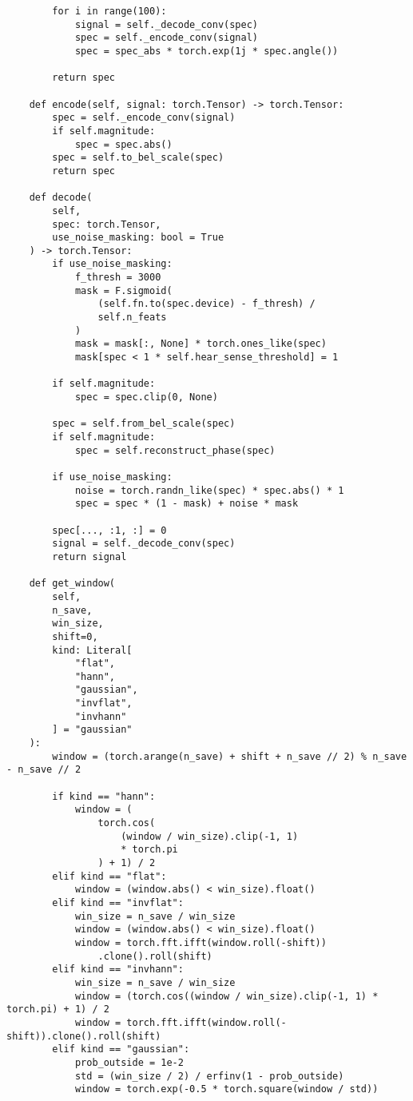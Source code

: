 \begin{verbatim}
        for i in range(100):
            signal = self._decode_conv(spec)
            spec = self._encode_conv(signal)
            spec = spec_abs * torch.exp(1j * spec.angle())

        return spec

    def encode(self, signal: torch.Tensor) -> torch.Tensor:
        spec = self._encode_conv(signal)
        if self.magnitude:
            spec = spec.abs()
        spec = self.to_bel_scale(spec)
        return spec
    
    def decode(
        self, 
        spec: torch.Tensor, 
        use_noise_masking: bool = True
    ) -> torch.Tensor:
        if use_noise_masking:
            f_thresh = 3000
            mask = F.sigmoid(
                (self.fn.to(spec.device) - f_thresh) / 
                self.n_feats
            )
            mask = mask[:, None] * torch.ones_like(spec)
            mask[spec < 1 * self.hear_sense_threshold] = 1

        if self.magnitude:
            spec = spec.clip(0, None)

        spec = self.from_bel_scale(spec)
        if self.magnitude:
            spec = self.reconstruct_phase(spec)
        
        if use_noise_masking:
            noise = torch.randn_like(spec) * spec.abs() * 1
            spec = spec * (1 - mask) + noise * mask

        spec[..., :1, :] = 0
        signal = self._decode_conv(spec)
        return signal
    
    def get_window(
        self, 
        n_save, 
        win_size, 
        shift=0, 
        kind: Literal[
            "flat", 
            "hann", 
            "gaussian", 
            "invflat", 
            "invhann"
        ] = "gaussian"
    ):
        window = (torch.arange(n_save) + shift + n_save // 2) % n_save - n_save // 2

        if kind == "hann":
            window = (
                torch.cos(
                    (window / win_size).clip(-1, 1) 
                    * torch.pi
                ) + 1) / 2
        elif kind == "flat":
            window = (window.abs() < win_size).float()
        elif kind == "invflat":
            win_size = n_save / win_size
            window = (window.abs() < win_size).float()
            window = torch.fft.ifft(window.roll(-shift))
                .clone().roll(shift)
        elif kind == "invhann":
            win_size = n_save / win_size
            window = (torch.cos((window / win_size).clip(-1, 1) * torch.pi) + 1) / 2
            window = torch.fft.ifft(window.roll(-shift)).clone().roll(shift)
        elif kind == "gaussian":
            prob_outside = 1e-2
            std = (win_size / 2) / erfinv(1 - prob_outside)
            window = torch.exp(-0.5 * torch.square(window / std))


\end{verbatim}
